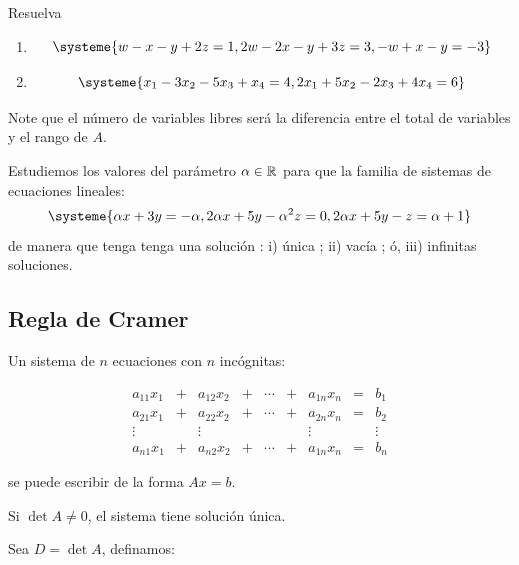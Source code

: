 \begin{ejer}
Resuelva

\begin{enumerate}
\item
\begin{equation*}
\systeme{
w - x - y + 2z = 1,
2w - 2x - y + 3z = 3,
-w + x - y = -3
}
\end{equation*}


\item
\begin{equation*}
\systeme{
 x_1 - 3x_2 - 5x_3 + x_4 = 4,
 2x_1 + 5x_2 - 2x_3 + 4x_4 = 6
}
\end{equation*}
\end{enumerate}
\end{ejer}
Note que el número de
variables libres será la diferencia entre el total de variables y el rango
de $A$.

\begin{ejer}
Estudiemos los valores del parámetro $\alpha\in \mathbb{R}$ para que la familia de sistemas de ecuaciones lineales:
\begin{equation*}
\systeme{
\alpha x + 3y = -\alpha,
2\alpha x + 5y -\alpha^2 z= 0,
2\alpha x + 5y-z = \alpha +1
}
\end{equation*}
de manera que tenga tenga una solución : i) única ; ii) vacía ; ó, iii) infinitas soluciones.
\end{ejer}




\subsection{Regla de Cramer}

Un sistema de $n$ ecuaciones con $n$ incógnitas: 

$$\begin{matrix} a_{11}x_1 & + & a_{12}x_2 & + & \cdots & + & a_{1n}x_n & = & b_1 \\ a_{21}x_1 & + & a_{22}x_2 & + & \cdots & + & a_{2n}x_n & = & b_2 \\ \vdots & & \vdots & & & & \vdots & & \vdots \\ a_{n1}x_1 & + & a_{n2}x_2 & + & \cdots & + & a_{1n}x_n & = & b_n \end{matrix}$$

se puede escribir de la forma $Ax = b$.


Si $\det A \not= 0$, el sistema tiene solución única. 

Sea $D = \det A$, definamos:


